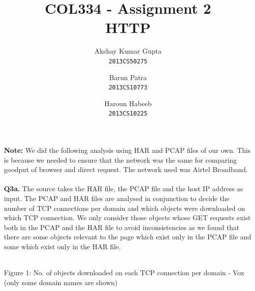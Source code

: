 \documentclass[12pt]{article}
\begin{document}
\title{COL334 - Assignment 2\\ HTTP}
\author{Akshay Kumar Gupta\\\texttt{2013CS50275} \and  Barun Patra\\\texttt{2013CS10773} \and Haroun Habeeb\\\texttt{2013CS10225}}
\date{}
\maketitle
\noindent
\textbf{Note:} We did the following analysis using HAR and PCAP files of our own. This is because we needed to ensure that the network was the same for comparing goodput of browser and direct request. The network used was Airtel Broadband.\\\\
{\bfseries Q3a.} The source takes the HAR file, the PCAP file and the host IP address as input. The PCAP and HAR files are analysed in conjunction to decide the number of TCP connections per domain and which objects were downloaded on which TCP connection. We only consider those objects whose GET requests exist both in the PCAP and the HAR file to avoid inconsistencies as we found that there are some objects relevant to the page which exist only in the PCAP file and some which exist only in the HAR file.
\\\\
\hspace*{-1.4cm}
{
}
\vspace*{-0.6cm}
\begin{center}Figure 1: No. of objects downloaded on each TCP connection per domain - Vox (only some domain names are shown)\end{center}
\hspace*{-1.4cm}
{
}
\end{document}

